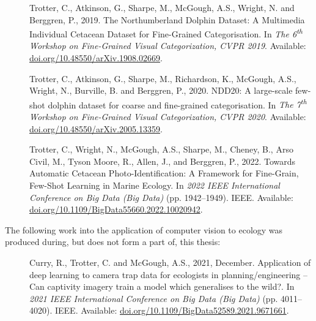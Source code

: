 \begin{description}
	
	\item[\cite{trotter_northumberland_2019}] Trotter, C., Atkinson, G., Sharpe, M., McGough, A.S., Wright, N. and Berggren, P., 2019. The Northumberland Dolphin Dataset: A Multimedia Individual Cetacean Dataset for Fine-Grained Categorisation. In \textit{The 6\textsuperscript{th} Workshop on Fine-Grained Visual Categorization, CVPR 2019}. Available: \href{https://doi.org/10.48550/arXiv.1908.02669}{doi.org/10.48550/arXiv.1908.02669}.
	
	\item[\cite{trotter_ndd20_2020}] Trotter, C., Atkinson, G., Sharpe, M., Richardson, K., McGough, A.S., Wright, N., Burville, B. and Berggren, P., 2020. NDD20: A large-scale few-shot dolphin dataset for coarse and fine-grained categorisation. In \textit{The 7\textsuperscript{th} Workshop on Fine-Grained Visual Categorization, CVPR 2020}. Available: \href{https://doi.org/10.48550/arXiv.2005.13359}{doi.org/10.48550/arXiv.2005.13359}. 
	
	\item [\cite{trotter_towards_2022}] Trotter, C., Wright, N., McGough, A.S., Sharpe, M., Cheney, B., Arso Civil, M., Tyson Moore, R., Allen, J., and Berggren, P., 2022. Towards Automatic Cetacean Photo-Identification: A Framework for Fine-Grain, Few-Shot Learning in Marine Ecology. In \textit{2022 IEEE International Conference on Big Data (Big Data)} (pp. 1942--1949). IEEE.  Available: \href{https://doi.org/10.1109/BigData55660.2022.10020942}{doi.org/10.1109/BigData55660.2022.10020942}.
\end{description}

\noindent The following work into the application of computer vision to ecology was produced during, but does not form a part of, this thesis:

\begin{description}
	\item[\cite{curry_application_2021}] Curry, R., Trotter, C. and McGough, A.S., 2021, December. Application of deep learning to camera trap data for ecologists in planning/engineering – Can captivity imagery train a model which generalises to the wild?. In \textit{2021 IEEE International Conference on Big Data (Big Data)} (pp. 4011--4020). IEEE. Available: \href{	https://doi.org/10.1109/BigData52589.2021.9671661}{doi.org/10.1109/BigData52589.2021.9671661}.
\end{description}



